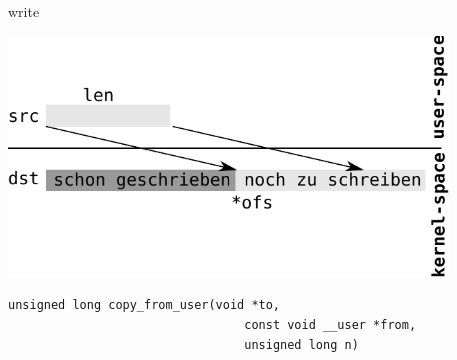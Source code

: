 \begin{frame}[fragile]{write}
\begin{center}
 \includegraphics[width=0.875\textwidth]{user-kernel-space-write.pdf}
\end{center}
\vspace{-1.5cm}
\begin{lstlisting}
unsigned long copy_from_user(void *to, 
                                 const void __user *from, 
                                 unsigned long n)
\end{lstlisting}
\end{frame}
